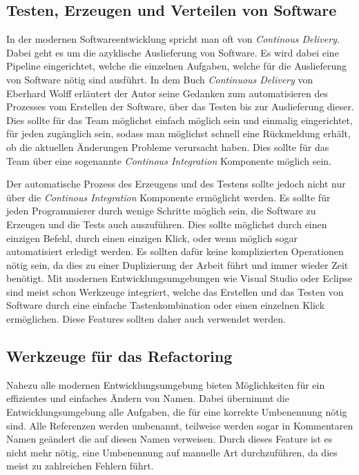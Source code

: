\subsection{Testen, Erzeugen und Verteilen von Software}
In der modernen Softwareentwicklung spricht man oft von \textit{Continous Delivery}. Dabei geht es um die azyklische Auslieferung von Software. Es wird dabei eine Pipeline eingerichtet, welche die einzelnen Aufgaben, welche für die Auslieferung von Software nötig sind ausführt. In dem Buch \textit{Continuous Delivery} von Eberhard Wolff erläutert der Autor seine Gedanken zum automatisieren des Prozesses vom Erstellen der Software, über das Testen bis zur Auslieferung dieser. Dies sollte für das Team möglichst einfach möglich sein und einmalig eingerichtet, für jeden zugänglich sein, sodass man möglichst schnell eine Rückmeldung erhält, ob die aktuellen Änderungen Probleme verursacht haben. Dies sollte für das Team über eine sogenannte \textit{Continous Integration} Komponente möglich sein.

\SuperPar Der automatische Prozess des Erzeugens und des Testens sollte jedoch nicht nur über die \textit{Continous Integration} Komponente ermöglicht werden. Es sollte für jeden Programmierer durch wenige Schritte möglich sein, die Software zu Erzeugen und die Tests auch auszuführen. Dies sollte möglichst durch einen einzigen Befehl, durch einen einzigen Klick, oder wenn möglich sogar automatisiert erledigt werden. Es sollten dafür keine komplizierten Operationen nötig sein, da dies zu einer Duplizierung der Arbeit führt und immer wieder Zeit benötigt. Mit modernen Entwicklungsumgebungen wie Visual Studio oder Eclipse sind meist schon Werkzeuge integriert, welche das Erstellen und das Testen von Software durch eine einfache Tastenkombination oder einen einzelnen Klick ermöglichen. Diese Features sollten daher auch verwendet werden.

\subsection{Werkzeuge für das Refactoring}
Nahezu alle modernen Entwicklungsumgebung bieten Möglichkeiten für ein effizientes und einfaches Ändern von Namen. Dabei übernimmt die Entwicklungsumgebung alle Aufgaben, die für eine korrekte Umbenennung nötig sind. Alle Referenzen werden umbenannt, teilweise werden sogar in Kommentaren Namen geändert die auf diesen Namen verweisen. Durch dieses Feature ist es nicht mehr nötig, eine Umbenennung auf manuelle Art durchzuführen, da dies meist zu zahlreichen Fehlern führt. 


